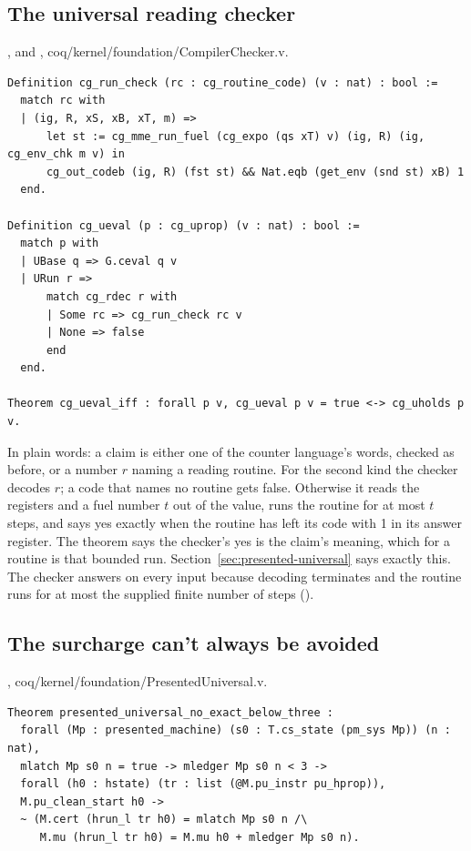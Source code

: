 \subsection{The universal reading checker}

{\raggedright {},  and , coq/kernel/foundation/CompilerChecker.v.\par}

{\scriptsize
\begin{verbatim}
Definition cg_run_check (rc : cg_routine_code) (v : nat) : bool :=
  match rc with
  | (ig, R, xS, xB, xT, m) =>
      let st := cg_mme_run_fuel (cg_expo (qs xT) v) (ig, R) (ig, cg_env_chk m v) in
      cg_out_codeb (ig, R) (fst st) && Nat.eqb (get_env (snd st) xB) 1
  end.

Definition cg_ueval (p : cg_uprop) (v : nat) : bool :=
  match p with
  | UBase q => G.ceval q v
  | URun r =>
      match cg_rdec r with
      | Some rc => cg_run_check rc v
      | None => false
      end
  end.

Theorem cg_ueval_iff : forall p v, cg_ueval p v = true <-> cg_uholds p v.
\end{verbatim}}

In plain words: a claim is either one of the counter language's words, checked as before, or a
number $r$ naming a reading routine. For the second kind the checker decodes $r$; a code that
names no routine gets false. Otherwise it reads the registers and a fuel number $t$ out of the
value, runs the routine for at most $t$ steps, and says yes exactly when the routine has left its
code with 1 in its answer register. The theorem says the checker's yes is the claim's meaning,
which for a routine is that bounded run. Section~\ref{sec:presented-universal} says exactly this.
The checker answers on every input because decoding terminates and the routine runs for
at most the supplied finite number of steps
().

\subsection{The surcharge can't always be avoided}

{\raggedright {}, coq/kernel/foundation/PresentedUniversal.v.\par}

{\scriptsize
\begin{verbatim}
Theorem presented_universal_no_exact_below_three :
  forall (Mp : presented_machine) (s0 : T.cs_state (pm_sys Mp)) (n : nat),
  mlatch Mp s0 n = true -> mledger Mp s0 n < 3 ->
  forall (h0 : hstate) (tr : list (@M.pu_instr pu_hprop)),
  M.pu_clean_start h0 ->
  ~ (M.cert (hrun_l tr h0) = mlatch Mp s0 n /\
     M.mu (hrun_l tr h0) = M.mu h0 + mledger Mp s0 n).
\end{verbatim}}

